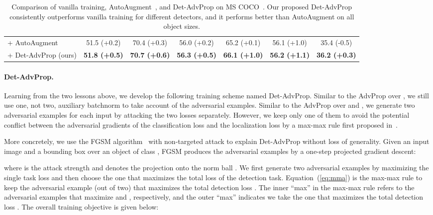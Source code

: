 \documentclass[final]{cvpr}
\begin{document}
\begin{table*}[!htb]
{\begin{tabular}{l|c|c|c|c|c|c}
+ AutoAugment & 51.5 (+0.2) & 70.4 (+0.3) & 56.0 (+0.2) & 65.2 (+0.1) & 56.1 (+1.0) & 35.4 (-0.5) \\
+ Det-AdvProp (ours) & \textbf{51.8 (+0.5)} & \textbf{70.7 (+0.6)} & \textbf{56.3 (+0.5)} & \textbf{66.1 (+1.0)} & \textbf{56.2 (+1.1)} & \textbf{36.2 (+0.3)} \\ \hline
\end{tabular}}
\smallskip
\caption{Comparison of vanilla training, AutoAugment~\cite{zoph2019learning}, and Det-AdvProp on MS COCO~\cite{lin2015coco}. Our proposed Det-AdvProp consistently outperforms vanilla training  for different detectors, and it performs better than AutoAugment on all object sizes.}
\label{tab:main}
\vspace{-10pt}
\end{table*}


\vspace{-10pt}
\paragraph{Det-AdvProp.}
Learning from the two lessons above, we develop the following training scheme named Det-AdvProp. Similar to the AdvProp over ,  we still use one, not two, auxiliary batchnorm to take account of the adversarial examples. Similar to the AdvProp over   and , we generate two adversarial examples for each input by attacking the two losses separately. However, we keep only one of them to avoid the potential conflict between the adversarial gradients of the classification loss and the localization loss by a max-max rule first proposed in~\cite{zhang2019towards}.



More concretely, we use the FGSM algorithm~\cite{goodfellow2015fgsm} with non-targeted attack to explain Det-AdvProp without loss of generality. Given an input image  and a bounding box  over an object of class , FGSM produces the adversarial examples by a one-step projected gradient descent:

where  is the attack strength and  denotes the projection onto the norm ball .
We first generate two adversarial examples by maximizing the single task loss and then choose the one that maximizes the total loss of the detection task. Equation~(\ref{eq:mma}) is the max-max rule to keep the adversarial example (out of two) that maximizes the total detection loss . The inner ``max'' in the max-max rule refers to the adversarial examples that maximize  and , respectively, and the outer ``max'' indicates we take the one that maximizes the total detection loss .
The overall training objective is given below:
\end{document}
